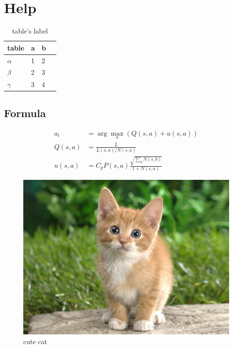 \section{Help}

\begin{table}
	\begin{tabularx}{\textwidth}{XXXX}
		\toprule
		table & a & b \\
		\midrule
    $\alpha$ & 1 & 2 \\
    $\beta$  & 2 & 3 \\
    $\gamma$ & 3 & 4 \\
		\bottomrule
	\end{tabularx}
	\caption
	{
		\label{tab:example}
    table's label
	}
\end{table}

\subsection{Formula}

\begin{align}
	a_t & = \arg\max\limits_{a}\left(Q(s,a)+u(s,a)\right)\\
	Q(s,a) & =\frac{\bar{L}}{L(s,a)/N(s,a)} \\
	u(s,a) & = C_pP(s,a)\frac{\sqrt{\sum_bN(s,b)}}{1+N(s,a)}
\label{eqn:select}
\end{align}

\begin{figure}
\centering\includegraphics[height=0.36\textheight]{images/cat.jpeg}
\caption{
\label{fig:cat}
cute cat
}
\end{figure}

